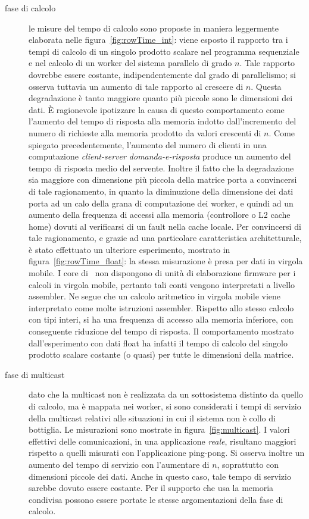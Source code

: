 \begin{description}
\item [fase di calcolo] le misure del tempo di calcolo sono proposte in maniera leggermente elaborata nelle figura~\ref{fig:rowTime_int}: viene esposto il rapporto tra i tempi di calcolo di un singolo prodotto scalare nel programma sequenziale e nel calcolo di un worker del sistema parallelo di grado $n$. Tale rapporto dovrebbe essere costante, indipendentemente dal grado di parallelismo; si osserva tuttavia un aumento di tale rapporto al crescere di $n$. Questa degradazione \`e tanto maggiore quanto pi\`u piccole sono le dimensioni dei dati. \`E ragionevole ipotizzare la causa di questo comportamento come l'aumento del tempo di risposta alla memoria indotto dall'incremento del numero di richieste alla memoria prodotto da valori crescenti di $n$. Come spiegato precedentemente, l'aumento del numero di clienti in una computazione \emph{client-server domanda-e-risposta} produce un aumento del tempo di risposta medio del servente. Inoltre il fatto che la degradazione sia maggiore con dimensione pi\`u piccola della matrice porta a convincersi di tale ragionamento, in quanto la diminuzione della dimensione dei dati porta ad un calo della grana di computazione dei worker, e quindi ad un aumento della frequenza di accessi alla memoria (controllore o L2 cache home) dovuti al verificarsi di un fault nella cache locale. Per convincersi di tale ragionamento, e grazie ad una particolare caratteristica architetturale, \`e stato effettuato un ulteriore esperimento, mostrato in figura~\ref{fig:rowTime_float}: la stessa misurazione \`e presa per dati in virgola mobile.  I core di \tile\ non dispongono di unit\`a di elaborazione firmware per i calcoli in virgola mobile, pertanto tali conti vengono interpretati a livello assembler. Ne segue che un calcolo aritmetico in virgola mobile viene interpretato come molte istruzioni assembler. Rispetto allo stesso calcolo con tipi interi, si ha una frequenza di accesso alla memoria inferiore, con conseguente riduzione del tempo di risposta. Il comportamento mostrato dall'esperimento con dati float ha infatti il tempo di calcolo del singolo prodotto scalare costante (o quasi) per tutte le dimensioni della matrice.
\item [fase di multicast] dato che la multicast non \`e realizzata da un sottosistema distinto da quello di calcolo, ma \`e mappata nei worker, si sono considerati i tempi di servizio della multicast relativi alle situazioni in cui il sistema non \`e collo di bottiglia. Le misurazioni sono mostrate in figura~\ref{fig:multicast}. I valori effettivi delle comunicazioni, in una applicazione \emph{reale}, risultano maggiori rispetto a quelli misurati con l'applicazione ping-pong. Si osserva inoltre un aumento del tempo di servizio con l'aumentare di $n$, soprattutto con dimensioni piccole dei dati. Anche in questo caso, tale tempo di servizio sarebbe dovuto essere costante. Per il supporto che usa la memoria condivisa possono essere portate le stesse argomentazioni della fase di calcolo.
\end{description}

